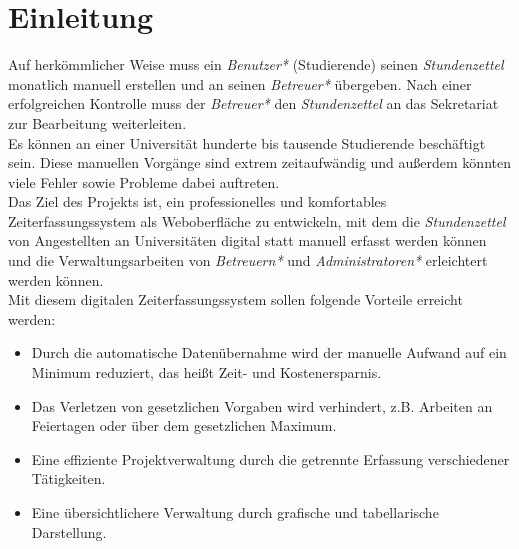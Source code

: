 \section{Einleitung}

Auf herkömmlicher Weise muss ein \emph{Benutzer*} (Studierende) seinen \emph{Stundenzettel} monatlich manuell erstellen und an seinen \emph{Betreuer*} übergeben. Nach einer erfolgreichen Kontrolle muss der \emph{Betreuer*} den \emph{Stundenzettel} an das Sekretariat zur Bearbeitung weiterleiten. \\

Es können an einer Universität hunderte bis tausende Studierende beschäftigt sein. Diese manuellen Vorgänge sind extrem zeitaufwändig und außerdem könnten viele Fehler sowie Probleme dabei auftreten.\\

Das Ziel des Projekts ist, ein professionelles und komfortables Zeiterfassungssystem als Weboberfläche zu entwickeln, mit dem die \emph{Stundenzettel} von Angestellten an Universitäten digital statt manuell erfasst werden können und die Verwaltungsarbeiten von \emph{Betreuern*} und \emph{Administratoren*} erleichtert werden können.\\

Mit diesem digitalen Zeiterfassungssystem sollen folgende Vorteile erreicht werden:

\begin{itemize}
	\item Durch die automatische Datenübernahme wird der manuelle Aufwand auf ein Minimum reduziert, das heißt Zeit- und Kostenersparnis.
	\item Das Verletzen von gesetzlichen Vorgaben wird verhindert, z.B. Arbeiten an Feiertagen oder über dem gesetzlichen Maximum.
	\item Eine effiziente Projektverwaltung durch die getrennte Erfassung verschiedener Tätigkeiten.
	\item Eine übersichtlichere Verwaltung durch grafische und tabellarische Darstellung.
\end{itemize}
